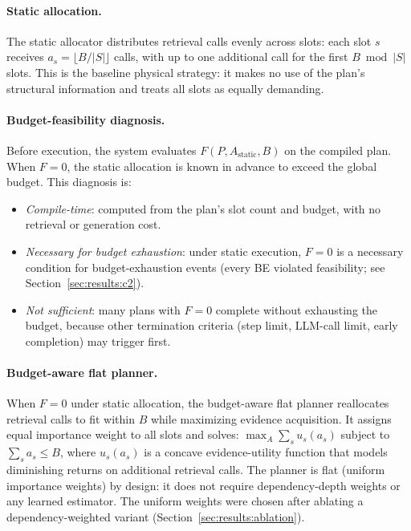 \paragraph{Static allocation.}
The static allocator distributes retrieval calls evenly across slots: each slot $s$ receives $a_s = \lfloor B / |S| \rfloor$ calls, with up to one additional call for the first $B \bmod |S|$ slots. This is the baseline physical strategy: it makes no use of the plan's structural information and treats all slots as equally demanding.

\paragraph{Budget-feasibility diagnosis.}
Before execution, the system evaluates $F(P, A_{\text{static}}, B)$ on the compiled plan. When $F = 0$, the static allocation is known in advance to exceed the global budget. This diagnosis is:
\begin{itemize}
\item \emph{Compile-time}: computed from the plan's slot count and budget, with no retrieval or generation cost.
\item \emph{Necessary for budget exhaustion}: under static execution, $F = 0$ is a necessary condition for budget-exhaustion events (every BE violated feasibility; see Section~\ref{sec:results:c2}).
\item \emph{Not sufficient}: many plans with $F = 0$ complete without exhausting the budget, because other termination criteria (step limit, LLM-call limit, early completion) may trigger first.
\end{itemize}

\paragraph{Budget-aware flat planner.}
When $F = 0$ under static allocation, the budget-aware flat planner reallocates retrieval calls to fit within $B$ while maximizing evidence acquisition. It assigns equal importance weight to all slots and solves: $\max_{A} \sum_s u_s(a_s)$ subject to $\sum_s a_s \leq B$, where $u_s(a_s)$ is a concave evidence-utility function that models diminishing returns on additional retrieval calls. The planner is flat (uniform importance weights) by design: it does not require dependency-depth weights or any learned estimator. The uniform weights were chosen after ablating a dependency-weighted variant (Section~\ref{sec:results:ablation}).

